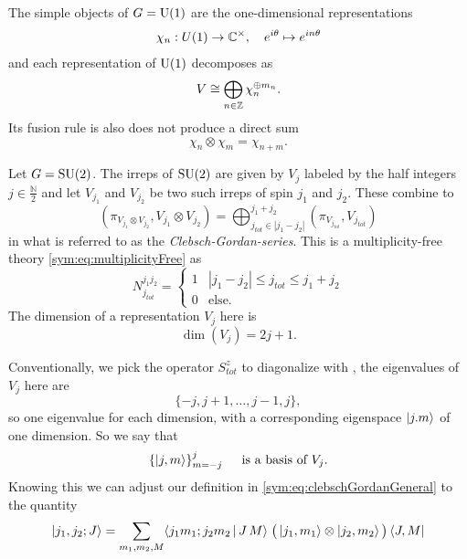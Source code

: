 \begin{example}
  The simple objects of $G = \mathrm{U}(1)$ are the one-dimensional representations
  \begin{equation}\label{sym:eq:U1rep}
    \chi_n : U(1) \to \mathbb{C}^{\times}, \quad e^{i\theta} \mapsto e^{i n \theta} 
  \end{equation}
  and each representation of $\mathrm{U}(1)$ decomposes as 
  \[
    V \cong \bigoplus_{n \in \mathbb{Z}} \chi_n^{\oplus m_n}. 
  \]
  Its fusion rule is also does not produce a direct sum
  \begin{equation}\label{symm:eq:U1FusionRule}
    \chi_n \otimes \chi_m = \chi_{n + m}.
  \end{equation}
\end{example}


\begin{example} Let $G = \mathrm{SU}(2)$. The irreps of $\mathrm{SU}(2)$ are
  given by $V_j$ labeled by the half integers $j \in \frac{\mathbb{N}}{2}$ and
  let $V_{j_1}$ and $V_{j_2}$ be two such irreps of spin $j_1$ and $j_2$. These
  combine to
  \begin{equation}
    (\pi_{V_{j_1} \otimes V_{j_2}}, V_{j_1} \otimes V_{j_2}) 
    = 
    \bigoplus_{j_{tot} \in \left\vert j_1 - j_2 \right\vert}^{j_1 + j_2}
    (\pi_{V_{j_{tot}}}, V_{j_{tot}})
    \label{sym:eq:cgseries}
  \end{equation}
  in what is referred to as the \emph{Clebsch-Gordan-series}. This is a
  multiplicity-free theory \eqref{sym:eq:multiplicityFree} as
  \begin{equation}
    N^{j_1 j_2}_{j_{tot}} = \begin{cases}
      1 & |j_1 - j_2| \leq j_{tot} \leq j_1 + j_2 \\
      0 & \text{else}.
    \end{cases}
  \end{equation} The dimension of a
  representation $V_j$ here is 
  \begin{equation}\label{sym:eq:su2dim}
    \dim(V_j) = 2j+1.
  \end{equation}

  Conventionally, we pick the operator $S^z_{tot}$ to diagonalize with
  , the eigenvalues of $V_j$ here are
  \[
    \{-j,j+1,\ldots,j-1,j\},
  \]
  so one eigenvalue for each dimension, with a corresponding eigenspace
  $\left| j.m \right\rangle$ of one dimension. So we say that
  \[
    \left\{ \left| j,m \right\rangle\right\}_{m=-j}^j \quad \text{ is a basis of } V_j.
  \]
  Knowing this we can adjust our definition in \eqref{sym:eq:clebschGordanGeneral} to the quantity
  \[
    \left| j_1,j_2;J \right\rangle
    =
    \sum_{m_1,m_2,M}
    \langle
      j_1m_1;j_2m_2\,|\,J\,M
    \rangle\;
    \big(
      \left| j_1,m_1 \right\rangle
      \otimes
      \left| j_2,m_2 \right\rangle
    \big)
    \left\langle J,M \right|
  \]
\end{example}

